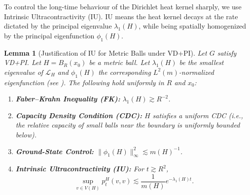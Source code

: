 \documentclass{article}
\numberwithin{equation}{section}
\newtheorem{lemma}[theorem]{Lemma}
\theoremstyle{definition}
\theoremstyle{remark}
\newcommand{\LL}{\mathcal{L}}
\begin{document}
To control the long-time behaviour of the Dirichlet heat kernel sharply, we use Intrinsic Ultracontractivity (IU). IU means the heat kernel decays at the rate dictated by the principal eigenvalue $\lambda_1(H)$, while being spatially homogenized by the principal eigenfunction $\phi_1(H)$.

\begin{lemma}[Justification of IU for Metric Balls under VD+PI]\label{lem:IU_derivation}
Let $G$ satisfy VD+PI. Let $H=B_R(x_0)$ be a metric ball. Let $\lambda_1(H)$ be the smallest eigenvalue of $\LL_H$ and $\phi_1(H)$ the corresponding $L^2(m)$-normalized eigenfunction (see ). The following hold uniformly in $R$ and $x_0$:
\begin{enumerate}
    \item \textbf{Faber--Krahn Inequality (FK):} $\lambda_1(H) \gtrsim R^{-2}$.
    \item \textbf{Capacity Density Condition (CDC):} $H$ satisfies a uniform CDC (i.e., the relative capacity of small balls near the boundary is uniformly bounded below).
    \item \textbf{Ground-State Control:} $\|\phi_1(H)\|_{\infty}^2 \lesssim m(H)^{-1}$.
    \item \textbf{Intrinsic Ultracontractivity (IU):} For $t \gtrsim R^2$,
    \[
    \sup_{v \in V(H)} p_t^H(v,v) \lesssim \frac{1}{m(H)} e^{-\lambda_1(H) t}.
    \]
\end{enumerate}
\end{lemma}
\end{document}
